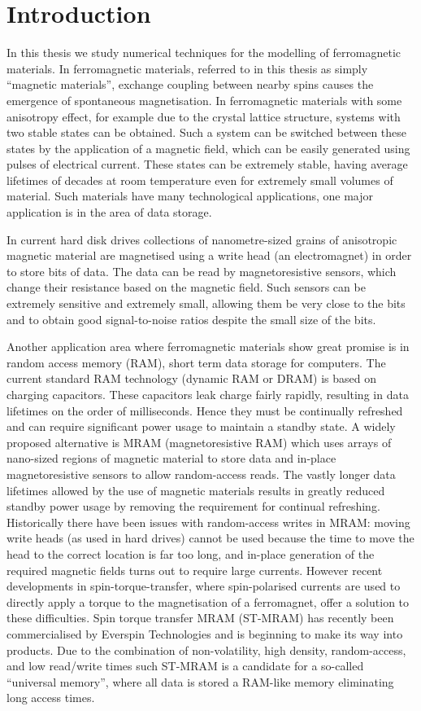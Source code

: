 
\chapter{Introduction}
\label{sec:introduction}

In this thesis we study numerical techniques for the modelling of ferromagnetic materials.
In ferromagnetic materials, referred to in this thesis as simply ``magnetic materials'', exchange coupling between nearby spins causes the emergence of spontaneous magnetisation.
In ferromagnetic materials with some anisotropy effect, for example due to the crystal lattice structure, systems with two stable states can be obtained.
Such a system can be switched between these states by the application of a magnetic field, which can be easily generated using pulses of electrical current.
These states can be extremely stable, having average lifetimes of decades at room temperature even for extremely small volumes of material.
Such materials have many technological applications, one major application is in the area of data storage.

In current hard disk drives collections of nanometre-sized grains of anisotropic magnetic material are magnetised using a write head (an electromagnet) in order to store bits of data.
The data can be read by magnetoresistive sensors, which change their resistance based on the magnetic field.
Such sensors can be extremely sensitive and extremely small, allowing them be very close to the bits and to obtain good signal-to-noise ratios despite the small size of the bits.

Another application area where ferromagnetic materials show great promise is in random access memory (RAM), \ie short term data storage for computers.
The current standard RAM technology (dynamic RAM or DRAM) is based on charging capacitors.
These capacitors leak charge fairly rapidly, resulting in data lifetimes on the order of milliseconds.
Hence they must be continually refreshed and can require significant power usage to maintain a standby state.
A widely proposed alternative is MRAM (magnetoresistive RAM) which uses arrays of nano-sized regions of magnetic material to store data and in-place magnetoresistive sensors to allow random-access reads.
The vastly longer data lifetimes allowed by the use of magnetic materials results in greatly reduced standby power usage by removing the requirement for continual refreshing.
Historically there have been issues with random-access writes in MRAM: moving write heads (as used in hard drives) cannot be used because the time to move the head to the correct location is far too long, and in-place generation of the required magnetic fields turns out to require large currents.
However recent developments in spin-torque-transfer, where spin-polarised currents are used to directly apply a torque to the magnetisation of a ferromagnet, offer a solution to these difficulties.
Spin torque transfer MRAM (ST-MRAM) has recently been commercialised by Everspin Technologies \cite{everspin} and is beginning to make its way into products.
Due to the combination of non-volatility, high density, random-access, and low read/write times such ST-MRAM is a candidate for a so-called ``universal memory'', where all data is stored a RAM-like memory eliminating long access times.


